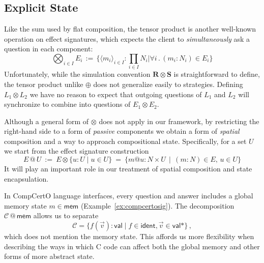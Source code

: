 \documentclass[acmsmall,screen,review,nonacm]{acmart}
\newcommand{\kw}[1]{\ensuremath{ \mathsf{#1} }}
\begin{document}

\subsection{Explicit State} %

Like the sum used by flat composition,
the tensor product is another well-known operation on effect signatures,
which expects the client to
\emph{simultaneously} ask a question in each component:
\[
  \bigotimes_{i \in I} E_i \, := \,
    \textstyle
    \big\{ \langle m_i \rangle_{i\in I} : \prod_{i \in I} N_i \mathrel{\big|}
       \forall i \mathbin. (m_i \mathbin: N_i) \in E_i \big\}
\]
Unfortunately,
while the simulation convention $\mathbf{R} \otimes \mathbf{S}$
is straightforward to define,
the tensor product unlike $\oplus$ does not generalize easily to strategies.
Defining
$L_1 \otimes L_2$ %
we have no reason to expect that
outgoing questions of $L_1$ and $L_2$
will synchronize to combine
into questions of $E_1 \otimes E_2$.

Although a general form of $\otimes$
does not apply in our framework,
by restricting the right-hand side
to a form of \emph{passive} components
we obtain a form of \emph{spatial} composition
and a way to approach compositional state.
Specifically,
for a set $U$
we start from the effect signature construction
\[
  E \mathbin@ U \::=\: E \otimes \{ u : U \mid u \in U \} \:=\:
    \{ m @ u : N \times U \,\mid\, (m \mathbin: N) \in E, \, u \in U \}
\]
It will play an important role
in our treatment of spatial composition and state encapsulation.

\begin{example} %
In CompCertO language interfaces,
every question and answer includes a global memory state $m \in \kw{mem}$ (Example~\ref{ex:compcertosig}).
The decomposition $\mathcal{C} \mathbin@ \kw{mem}$ allows us to separate
\[
  \mathcal{C} = \{ f(\vec{v}) \mathbin: \kw{val} \mid
      f \in \kw{ident}, \vec{v} \in \kw{val}* \}
  \,,
\]
which does not mention the memory state.
This affords us more flexibility
when describing the ways in which C code
can affect both the global memory
and other forms of more abstract state.
\end{example}
\end{document}
